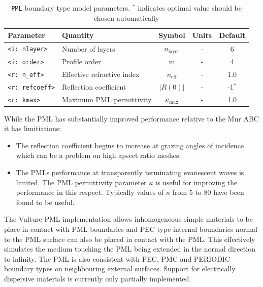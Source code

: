\documentclass[onecolumn,a4paper]{article}
\numberwithin{equation}{section}
\begin{document}
\begin{table}[ht]
\begin{center}
\begin{tabular}{|l|l|c|c|c|}
\hline
Parameter              &Quantity                   &Symbol                &Units &Default \\  
\hline
\texttt{<i:~nlayer>}   &Number of layers           &$n_\mathrm{layer}$    &-     &6       \\
\texttt{<i:~order>}    &Profile order              &m                     &-     &4       \\
\texttt{<r:~n\_eff>}   &Effective refractive index &$n_\mathrm{eff}$      &-     &1.0     \\
\texttt{<r:~refcoeff>} &Reflection coefficient     &$|R(0)|$              &-     &-1$^*$  \\
\texttt{<r:~kmax>}     &Maximum PML permittivity    &$\kappa_\mathrm{max}$ &-     &1.0     \\ 
\hline
\end{tabular}
\caption{\label{tb:tbpml}\texttt{PML} boundary type model parameters. $^*$ indicates optimal value 
should be chosen automatically}
\end{center}
\end{table}

While the PML has substantially improved performance relative to the Mur ABC it has limitiations:
\begin{itemize}
 \item The reflection coefficient begins to increase at grazing angles of incidence which can be a
 problem on high apsect ratio meshes.
 \item The PMLs performance at transparently terminating evanescent waves is limited. The PML permittivity 
 parameter $\kappa$ is useful for improving the performance in this respect. Typically values of 
 $\kappa$ from 5 to 80 have been found to be useful.
\end{itemize}

The Vulture PML implementation allows inhomogeneous
simple materials to be place in contact with PML boundaries and PEC type internal boundaries
normal to the PML surface can also be placed in contact with the PML. This effectively
simulates the medium touching the PML being extended in the normal direction to infinity. 
The PML is also 
consistent with PEC, PMC and PERIODIC boundary types on neighbouring external surfaces.
Support for electrically dispersive materials is currently only partially implemented.
 
\end{document}
